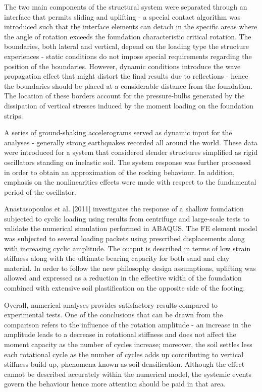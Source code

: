 \documentclass[10pt,a4paper]{report}
\begin{document}
The two main components of the structural system were separated through an interface that permits sliding and uplifting - a special contact algorithm was introduced such that the interface elements can detach in the specific areas where the angle of rotation exceeds the foundation characteristic critical rotation. The boundaries, both lateral and vertical, depend on the loading type the structure experiences - static conditions do not impose special requirements regarding the position of the boundaries. However, dynamic conditions introduce the wave propagation effect that might distort the final results due to reflections - hence the boundaries should be placed at a considerable distance from the foundation. The location of these borders account for the pressure-bulbs generated by the dissipation of vertical stresses induced by the moment loading on the foundation strips.

A series of ground-shaking accelerograms served as dynamic input for the analyses - generally strong earthquakes recorded all around the world. These data were introduced for a system that considered slender structures simplified as rigid oscillators standing on inelastic soil. The system response was further processed in order to obtain an approximation of the rocking behaviour. In addition, emphasis on the nonlinearities effects were made with respect to the fundamental period of the oscillator.

Anastasopoulos et al. [2011] \cite{anastasopoulos2011simplified} investigates the response of a shallow foundation subjected to cyclic loading using results from centrifuge and large-scale tests to validate the numerical simulation performed in ABAQUS. The FE element model was subjected to several loading packets using prescribed displacements along with increasing cyclic amplitude. The output is described in terms of low strain stiffness along with the ultimate bearing capacity for both sand and clay material. In order to follow the new philosophy design assumptions, uplifting was allowed and expressed as a reduction in the effective width of the foundation combined with extensive soil plastification on the opposite side of the footing.

Overall, numerical analyses provides satisfactory results compared to experimental tests. One of the conclusions that can be drawn from the comparison refers to the influence of the rotation amplitude - an increase in the amplitude leads to a decrease in rotational stiffness and does not affect the moment capacity as the number of cycles increase; moreover, the soil settles less each rotational cycle as the number of cycles adds up contributing to vertical stiffness build-up, phenomena known as soil densification. Although the effect cannot be described accurately within the numerical model, the systemic events govern the behaviour hence more attention should be paid in that area.
\end{document}
